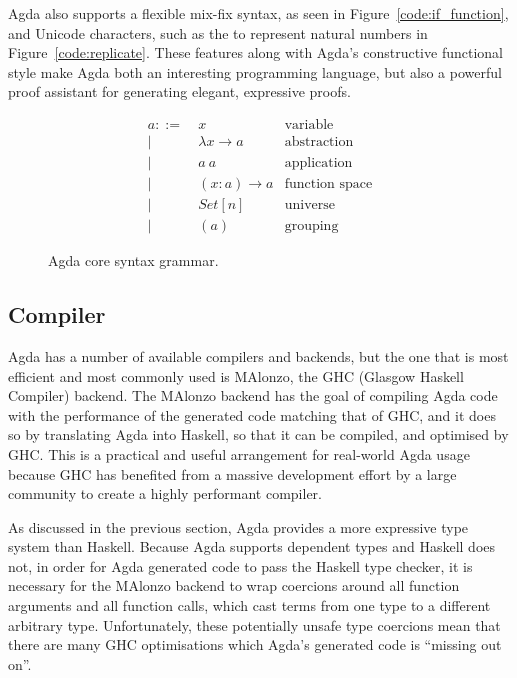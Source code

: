 Agda also supports a flexible mix-fix syntax, as seen in Figure~\ref{code:if_function}, and Unicode characters, such as the  to represent natural numbers in Figure~\ref{code:replicate}. These features along with Agda's constructive functional style make Agda both an interesting programming language, but also a powerful proof assistant for generating elegant, expressive proofs.



\begin{figure}[h]
\begin{align*}
a ::=~& x               & \text{variable}\\
    |~& \lambda x \to a & \text{abstraction}\\
    |~& a~a             & \text{application}\\
    |~& (x : a) \to a   & \text{function space}\\
    |~& Set[n]          & \text{universe}\\
    |~& (a)             & \text{grouping}
\end{align*}
\caption{Agda core syntax grammar.\citep{agdawiki}}
\label{fig:grammar}
\end{figure}

\subsection{Compiler}

Agda has a number of available compilers and backends, but the one that is most efficient and most commonly used is MAlonzo, the GHC (Glasgow Haskell Compiler) backend.\citep{benke2007} The MAlonzo backend has the goal of compiling Agda code with the performance of the generated code matching that of GHC, and it does so by translating Agda into Haskell, so that it can be compiled, and optimised by GHC. This is a practical and useful arrangement for real-world Agda usage because GHC has benefited from a massive development effort by a large community to create a highly performant compiler.\citep{benke2007}

As discussed in the previous section, Agda provides a more expressive type system than Haskell. Because Agda supports dependent types and Haskell does not, in order for Agda generated code to pass the Haskell type checker, it is necessary for the MAlonzo backend to wrap coercions around all function arguments and all function calls, which cast terms from one type to a different arbitrary type. Unfortunately, these potentially unsafe type coercions mean that there are many GHC optimisations which Agda's generated code is ``missing out on''.\citep{fredriksson2011}

